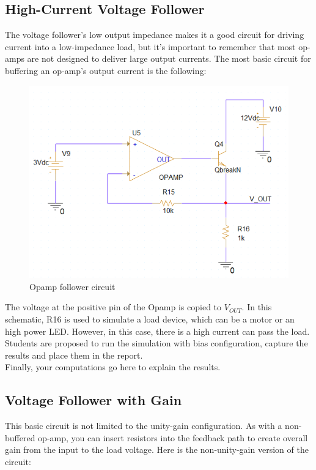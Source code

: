 
\subsection{High-Current Voltage Follower}
The voltage follower’s low output impedance makes it a good circuit for driving current into a low-impedance load, but it’s important to remember that most op-amps are not designed to deliver large output currents. The most basic circuit for buffering an op-amp’s output current is the following:

\begin{figure}[!htp]
    \centering
    \includegraphics[width = 4.5in]{source/picture/bai_5/opam_follower_2.PNG}
    \caption{Opamp follower circuit}
    \label{lab05_opamp_follower_2}
\end{figure}

The voltage at the positive pin of the Opamp is copied to $V_{OUT}$. In this schematic, R16 is used to simulate a load device, which can be a motor or an high power LED. However, in this case, there is a high current can pass the load. \\

Students are proposed to run the simulation with bias configuration, capture the results and place them in the report. \\

Finally, your computations go here to explain the results. 

\subsection{Voltage Follower with Gain}
This basic circuit is not limited to the unity-gain configuration. As with a non-buffered op-amp, you can insert resistors into the feedback path to create overall gain from the input to the load voltage. Here is the non-unity-gain version of the circuit:

